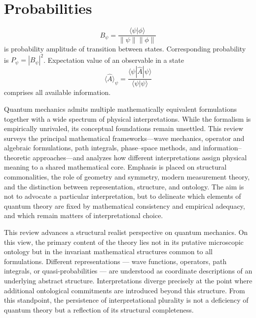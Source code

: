 \section{Probabilities}
\label{probabilities}
\begin{axiom}
    \label{born-rule}
    \[  B_\psi=\frac{\langle{\psi}|{\phi}\rangle}{\|{\psi}\| \|{\phi}\|}  \]
     is probability amplitude of transition between states. Corresponding 
     probability is $ P_\psi=|B_\psi|^2 $.
    Expectation value of an observable in a state 
    \begin{equation}
       \label {exp1}
    \langle \hat A \rangle_\psi = \frac{\langle \psi| \hat A |\psi \rangle} {\langle \psi|\psi \rangle}
    \end{equation}
    comprises all available information.
\end{axiom}

Quantum mechanics admits multiple mathematically equivalent formulations together
with a wide spectrum of physical interpretations. While the formalism is empirically
unrivaled, its conceptual foundations remain unsettled. This review surveys 
the principal mathematical frameworks—wave mechanics, operator and algebraic 
formulations, path integrals, phase--space methods, and information--theoretic 
approaches—and analyzes how different interpretations assign physical meaning to
a shared mathematical core. Emphasis is placed on structural commonalities, 
the role of geometry and symmetry, modern measurement theory, and the distinction 
between representation, structure, and ontology. The aim is not to advocate a particular
interpretation, but to delineate which elements of quantum theory are fixed by mathematical 
consistency and empirical adequacy, and which remain matters of interpretational choice.

This review advances a structural realist perspective on quantum mechanics. 
On this view, the primary content of the theory lies not in its putative 
microscopic ontology but in the invariant mathematical structures common 
to all formulations. Different representations --- wave functions, operators,
path integrals, or quasi-probabilities --- are understood as coordinate descriptions
of an underlying abstract structure. Interpretations diverge precisely at the 
point where additional ontological commitments are introduced beyond 
this structure. From this standpoint, the persistence of interpretational 
plurality is not a deficiency of quantum theory but a reflection of its 
structural completeness.

